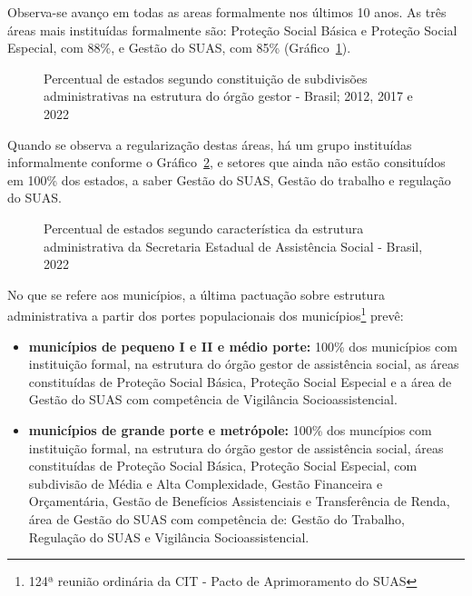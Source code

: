 \documentclass[
  letterpaper,
  DIV=11,
  numbers=noendperiod]{scrreprt}
\begin{document}
Observa-se avanço em todas as areas formalmente nos últimos 10 anos. As
três áreas mais instituídas formalmente são: Proteção Social Básica e
Proteção Social Especial, com 88\%, e Gestão do SUAS, com 85\%
(Gráfico~\ref{fig-uf_subd}).

\begin{figure}


\caption{\label{fig-uf_subd}Percentual de estados segundo constituição
de subdivisões administrativas na estrutura do órgão gestor - Brasil;
2012, 2017 e 2022}

\end{figure}%

Quando se observa a regularização destas áreas, há um grupo instituídas
informalmente conforme o
Gráfico~\ref{fig-estados-constituicao-subdivisoes}, e setores que ainda
não estão consituídos em 100\% dos estados, a saber Gestão do SUAS,
Gestão do trabalho e regulação do SUAS.

\begin{figure}


\caption{\label{fig-estados-constituicao-subdivisoes}Percentual de
estados segundo característica da estrutura administrativa da Secretaria
Estadual de Assistência Social - Brasil, 2022}

\end{figure}%

No que se refere aos municípios, a última pactuação sobre estrutura
administrativa a partir dos portes populacionais dos
municípios\footnote{124ª reunião ordinária da CIT - Pacto de
  Aprimoramento do SUAS} prevê:

\begin{itemize}
\item
  \textbf{municípios de pequeno I e II e médio porte:} 100\% dos
  municípios com instituição formal, na estrutura do órgão gestor de
  assistência social, as áreas constituídas de Proteção Social Básica,
  Proteção Social Especial e a área de Gestão do SUAS com competência de
  Vigilância Socioassistencial.
\item
  \textbf{municípios de grande porte e metrópole:} 100\% dos muncípios
  com instituição formal, na estrutura do órgão gestor de assistência
  social, áreas constituídas de Proteção Social Básica, Proteção Social
  Especial, com subdivisão de Média e Alta Complexidade, Gestão
  Financeira e Orçamentária, Gestão de Benefícios Assistenciais e
  Transferência de Renda, área de Gestão do SUAS com competência de:
  Gestão do Trabalho, Regulação do SUAS e Vigilância Socioassistencial.
\end{itemize}
\end{document}
